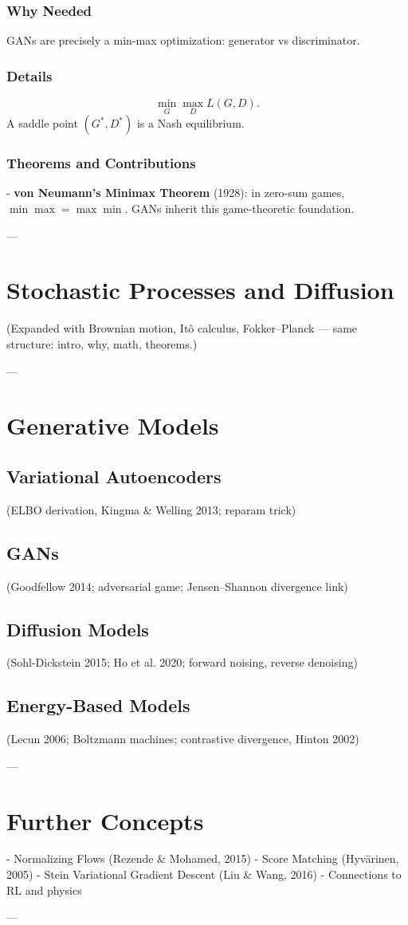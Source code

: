 \documentclass[11pt]{book}
\begin{document}
\subsection{Why Needed}
GANs are precisely a min-max optimization: generator vs discriminator.

\subsection{Details}
\[
\min_G \max_D L(G,D).
\]
A saddle point $(G^*, D^*)$ is a Nash equilibrium.

\subsection{Theorems and Contributions}
- \textbf{von Neumann’s Minimax Theorem} (1928): in zero-sum games, $\min \max = \max \min$.  
GANs inherit this game-theoretic foundation.

---

\chapter{Stochastic Processes and Diffusion}
(Expanded with Brownian motion, Itô calculus, Fokker–Planck — same structure: intro, why, math, theorems.)

---

\chapter{Generative Models}
\section{Variational Autoencoders}
(ELBO derivation, Kingma \& Welling 2013; reparam trick)

\section{GANs}
(Goodfellow 2014; adversarial game; Jensen–Shannon divergence link)

\section{Diffusion Models}
(Sohl-Dickstein 2015; Ho et al. 2020; forward noising, reverse denoising)

\section{Energy-Based Models}
(Lecun 2006; Boltzmann machines; contrastive divergence, Hinton 2002)

---

\chapter{Further Concepts}
- Normalizing Flows (Rezende \& Mohamed, 2015)  
- Score Matching (Hyvärinen, 2005)  
- Stein Variational Gradient Descent (Liu \& Wang, 2016)  
- Connections to RL and physics  

---
\end{document}
